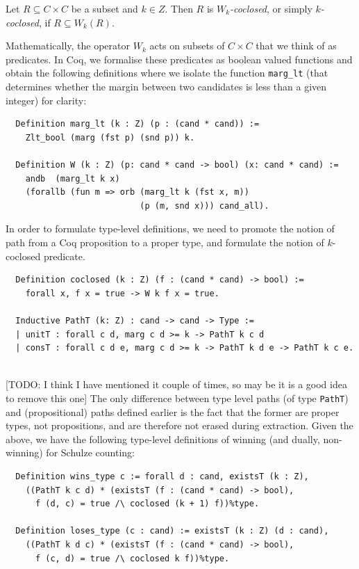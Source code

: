 \begin{definition} Let $R \subseteq C \times C$ be a subset and $k \in
Z$. Then $R$ is \emph{$W_k$-coclosed}, or simply
\emph{$k$-coclosed}, if $R \subseteq W_k(R)$.
\end{definition}

\noindent
Mathematically, the operator $W_k$ acts on subsets of $C \times C$
that we think of as predicates. In Coq, we formalise these
predicates as boolean valued functions and obtain the following
definitions where we isolate the function \texttt{marg\_lt} (that
determines whether the margin between two candidates is less than a
given integer) for clarity:

\begin{verbatim}
  Definition marg_lt (k : Z) (p : (cand * cand)) :=
    Zlt_bool (marg (fst p) (snd p)) k.

  Definition W (k : Z) (p: cand * cand -> bool) (x: cand * cand) :=
    andb  (marg_lt k x)
    (forallb (fun m => orb (marg_lt k (fst x, m)) 
                           (p (m, snd x))) cand_all).
\end{verbatim}

\noindent
In order to formulate type-level definitions, we need to promote the
notion of path from a Coq proposition to a proper type, and
formulate the notion of $k$-coclosed predicate.

\begin{verbatim} 
  Definition coclosed (k : Z) (f : (cand * cand) -> bool) :=
    forall x, f x = true -> W k f x = true.

  Inductive PathT (k: Z) : cand -> cand -> Type :=
  | unitT : forall c d, marg c d >= k -> PathT k c d
  | consT : forall c d e, marg c d >= k -> PathT k d e -> PathT k c e.
 
\end{verbatim}

[TODO: I think I have mentioned it couple of times, so may be it is a good idea to remove
 this one]
\noindent
The only difference between type level paths (of type
\texttt{PathT}) and (propositional) paths defined earlier is the
fact that the former are proper types, not propositions, and are
therefore not erased during extraction. 
Given the above, we have the
following type-level definitions of winning (and dually,
non-winning) for Schulze counting:

\begin{verbatim}
  Definition wins_type c := forall d : cand, existsT (k : Z),
    ((PathT k c d) * (existsT (f : (cand * cand) -> bool),
      f (d, c) = true /\ coclosed (k + 1) f))%type.

  Definition loses_type (c : cand) := existsT (k : Z) (d : cand),
    ((PathT k d c) * (existsT (f : (cand * cand) -> bool),
      f (c, d) = true /\ coclosed k f))%type.
\end{verbatim}

